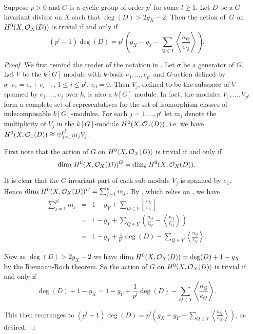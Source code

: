   \begin{prop}\label{nakaj}
    Suppose $p>0$ and $G$ is a cyclic group of order $p^l$ for some $l\geq 1$.
    Let $D$ be a $G$-invariant divisor on $X$ such that $\deg(D)>2g_X-2$.
    Then the action of~$G$ on $H^0(X,{\cal O}_X(D))$ is trivial if and only if
      \[ 
	(p^l-1)\deg(D)=p^l\left(g_X-g_Y-\sum_{Q\in Y}\left\langle \frac{n_Q}{e_Q} \right\rangle\right).
      \]
  \end{prop}
  \begin{proof}
We first remind the reader of the notation in \cite{kako}.
Let $\sigma$ be a generator of $G$.
Let $V$ be the $k[G]$ module with $k$-basis $e_1,\ldots ,e_{p^l}$ and $G$-action defined by $\sigma\cdot e_i=e_i+e_{i-1}$, $1\leq i \leq p^l,\ e_0=0$.
Then $V_j$, defined to be the subspace of $V$ spanned by $e_1,\ldots ,e_j$ over $k$, is also a $k[G]$ module.
In fact, the modules $V_1,\ldots ,V_{p^l}$ form a complete set of representatives for the set of isomorphism classes of indecomposable $k[G]$-modules. For each $j=1,\ldots,p^l$ let $m_j$ denote the multiplicity of $V_j$ in the $k[G]$-module $H^0(X,{\cal O}_x(D))$, i.e. we have $H^0(X,{\cal O}_x(D))\cong \oplus_{j=1}^{p^l}m_jV_j$.



    First note that the action of $G$ on $H^0(X,{\cal O}_X(D))$ is trivial if and only if
      \begin{equation}\label{triva}
	\dim_k H^0(X,{\cal O}_X(D))^G =\dim_k H^0(X,{\cal O}_X(D)).
      \end{equation}
	
    It is clear that the $G$-invariant part of each sub-module $V_j$ is spanned by $e_1$. 
    Hence $\dim_kH^0(X,{\cal O}_X(D))^G = \sum_{j=1}^{p^l} m_j$.
    By \cite[Thm 2.1]{quaddiffequi}, which relies on \cite{cohogsheaves}, we have
      \begin{eqnarray*}
	\sum_{j=1}^{p^l} m_j & = & 1- g_Y +\sum_{Q\in Y} \left\lfloor \frac{n_Q}{e_Q}\right\rfloor\\
	& = & 1- g_Y + \sum_{Q\in Y} \left( \frac{n_Q}{e_Q} - \left\langle \frac{n_Q}{e_Q}\right\rangle \right) \\
  	& = & 1 - g_Y + \frac{1}{p^l}\deg(D) - \sum_{Q\in Y} \left\langle \frac{n_Q}{e_Q} \right\rangle.
      \end{eqnarray*}

    Now as $\deg(D)>2g_X-2$ we have $\dim_kH^0(X,{\cal O}_X(D)) =\deg(D)+1-g_X$ by the Riemann-Roch theorem. 
    So the action of $G$ on $H^0(X,{\cal O}_X(D))$ is trivial if and only if
      \begin{equation*}
	\deg(D)+1-g_X  = 1 - g_Y + \frac{1}{p^l}\deg(D) - \sum_{Q\in Y}\left\langle \frac{n_Q}{e_Q} \right\rangle. \label{hi}
      \end{equation*}

    This then rearranges to $(p^l-1)\deg(D)=p^l\left(g_X-g_Y-\sum_{Q\in Y}\left\langle \frac{n_Q}{e_Q} \right\rangle\right)$, as desired.
    \end{proof}

